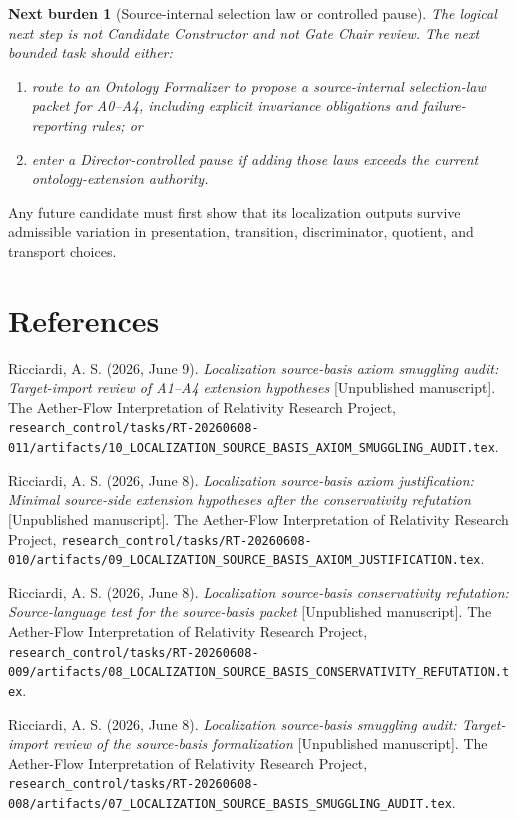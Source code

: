 \documentclass[11pt]{article}
\newtheorem{nextburden}{Next burden}
\begin{document}
\begin{nextburden}[Source-internal selection law or controlled pause]
The logical next step is not Candidate Constructor and not Gate Chair review.
The next bounded task should either:
\begin{enumerate}
    \item route to an Ontology Formalizer to propose a source-internal
    selection-law packet for A0--A4, including explicit invariance obligations
    and failure-reporting rules; or
    \item enter a Director-controlled pause if adding those laws exceeds the
    current ontology-extension authority.
\end{enumerate}
\end{nextburden}

Any future candidate must first show that its localization outputs survive
admissible variation in presentation, transition, discriminator, quotient,
and transport choices.

\section*{References}

Ricciardi, A. S. (2026, June 9). \emph{Localization source-basis axiom
smuggling audit: Target-import review of A1--A4 extension hypotheses}
[Unpublished manuscript]. The Aether-Flow Interpretation of Relativity
Research Project,
\texttt{research\_control/tasks/RT-20260608-011/artifacts/10\_LOCALIZATION\_SOURCE\_BASIS\_AXIOM\_SMUGGLING\_AUDIT.tex}.

Ricciardi, A. S. (2026, June 8). \emph{Localization source-basis axiom
justification: Minimal source-side extension hypotheses after the
conservativity refutation} [Unpublished manuscript]. The Aether-Flow
Interpretation of Relativity Research Project,
\texttt{research\_control/tasks/RT-20260608-010/artifacts/09\_LOCALIZATION\_SOURCE\_BASIS\_AXIOM\_JUSTIFICATION.tex}.

Ricciardi, A. S. (2026, June 8). \emph{Localization source-basis
conservativity refutation: Source-language test for the source-basis packet}
[Unpublished manuscript]. The Aether-Flow Interpretation of Relativity
Research Project,
\texttt{research\_control/tasks/RT-20260608-009/artifacts/08\_LOCALIZATION\_SOURCE\_BASIS\_CONSERVATIVITY\_REFUTATION.tex}.

Ricciardi, A. S. (2026, June 8). \emph{Localization source-basis smuggling
audit: Target-import review of the source-basis formalization} [Unpublished
manuscript]. The Aether-Flow Interpretation of Relativity Research Project,
\texttt{research\_control/tasks/RT-20260608-008/artifacts/07\_LOCALIZATION\_SOURCE\_BASIS\_SMUGGLING\_AUDIT.tex}.
\end{document}
